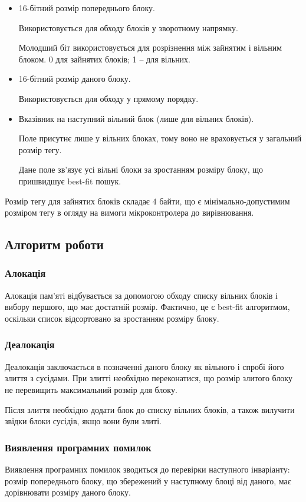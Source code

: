 \documentclass[main.tex]{subfiles}
\begin{document}
\begin{itemize}
\item 16-бітний розмір попереднього блоку.

  Використовується для обходу блоків у зворотному напрямку.

  Молодший біт використовується для розрізнення між зайнятим і вільним блоком. 0 для зайнятих блоків; 1 -- для вільних.

\item 16-бітний розмір даного блоку.

  Використовується для обходу у прямому порядку.

\item Вказівник на наступний вільний блок (лише для вільних блоків).

  Поле присутнє лише у вільних блоках, тому воно не враховується у загальний розмір тегу.

  Дане поле зв'язує усі вільні блоки за зростанням розміру блоку, що пришвидшує best-fit пошук.
\end{itemize}

Розмір тегу для зайнятих блоків складає 4 байти, що є мінімально-допустимим розміром тегу в огляду на вимоги мікроконтролера до вирівнювання.

\subsection{Алгоритм роботи}

\subsubsection{Алокація}
Алокація пам'яті відбувається за допомогою обходу списку вільних блоків і вибору першого, що має достатній розмір. Фактично, це є best-fit алгоритмом, оскільки список відсортовано за зростанням розміру блоку.

\subsubsection{Деалокація}
Деалокація заключається в позначенні даного блоку як вільного і спробі його злиття з сусідами. При злитті необхідно переконатися, що розмір злитого блоку не перевищить максимальний розмір для блоку.

Після злиття необхідно додати блок до списку вільних блоків, а також вилучити звідки блоки сусідів, якщо вони були злиті.

\subsubsection{Виявлення програмних помилок}
Виявлення програмних помилок зводиться до перевірки наступного інваріанту: розмір попереднього блоку, що збережений у наступному блоці від даного, має дорівнювати розміру даного блоку.
\end{document}
